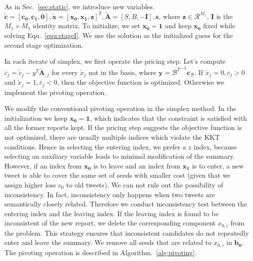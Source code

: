 \documentclass[envcountsame]{llncs}
\begin{document}
As in Sec.~\ref{sec:static}, we introduce new variables.  $\tilde{\mathbf{c}}=[\mathbf{c_0},\mathbf{c_1}, \mathbf{0}],\tilde{\mathbf{x}}=[\mathbf{x_0},\mathbf{x_1},\mathbf{z}]^T,\tilde{\mathbf{A}}=[S,B,-\mathbf{I}],\mathbf{s}$, where $\mathbf{z}\in\mathcal{R}^{M_1}$, $ \mathbf{I}$ is the $M_1\times M_1$ identity matrix. To initialize, we set  $\mathbf{x_0}=\mathbf{1}$ and keep $\mathbf{x_0}$ fixed while solving Equ.~\ref{equ:stageI}. We use the solution as the initialized guess for the second stage optimization.

In each iterate of simplex, we first operate the pricing step.  Let's compute $\bar{c}_j = \tilde{c}_j - y^T\tilde{\mathbf{A}}_{,j}$ for every $\tilde{x}_j$ not in the basis, where $\mathbf{y} = {\mathcal{B}^T}^{-1}\mathbf{c_\mathcal{B}}$. If $\tilde{x}_j = 0, \bar{c}_j > 0$ and $\tilde{x}_j = 1,\bar{c}_j < 0$, then the objective function is optimized. Otherwise we implement the pivoting operation.

We modify the conventional pivoting operation in the simplex method. In the initialization we keep $\mathbf{x_0}=\mathbf{1}$, which indicates that the constraint is satisfied with all the former reports kept. If the pricing step suggests the objective function is not optimized, there are usually multiple indices which violate the KKT conditions.  Hence in selecting the entering index, we prefer a $z$ index, because selecting an auxiliary variable leads to minimal modification of the summary. However, if an index from $\mathbf{x_0}$ is to leave and an index from $\mathbf{x_1}$ is to enter, a new tweet is able to cover the same set of seeds with smaller cost (given that we assign higher loss $c_0$ to old tweets). We can not rule out the possibility of inconsistency. In fact, inconsistency only happens when two tweets are semantically closely related. Therefore we conduct inconsistency test between the entering index and the leaving index. If the leaving index is found to be inconsistent of the new report, we delete the corresponding component $x_{0,i}$ from the problem. This strategy ensures that inconsistent candidates do not repeatedly enter and leave the summary. We remove all seeds that are related to $x_{0,i}$ in $\mathbf{b_0}$. The pivoting operation is described in Algorithm.~\ref{alg:pivoting}.
\end{document}
